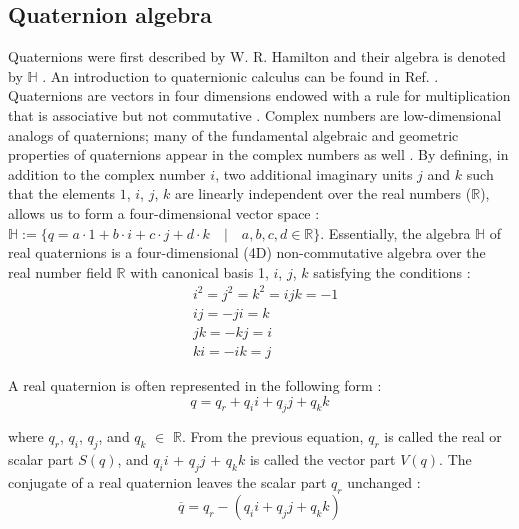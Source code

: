 \documentclass[superscriptaddress,longbibliography,aps,prl,twocolumn,10pt]{revtex4-2}
\begin{document}
\subsection*{\normalsize{Quaternion algebra}}
Quaternions were first described by W. R. Hamilton \cite{Grant2015} and their algebra is denoted by $\mathbb{H}$ \cite{BayroCorrochano2019}. An introduction to quaternionic calculus can be found in Ref. \cite{Morais2014}. Quaternions are vectors in four dimensions endowed with a rule for multiplication that is associative but not commutative \cite{Goldman2011}. Complex numbers are low-dimensional analogs of quaternions; many of the fundamental algebraic and geometric properties of quaternions appear in the complex numbers as well \cite{Goldman2011}. By defining, in addition to the complex number $i$, two additional imaginary units $j$ and $k$ such that the elements $1$, $i$, $j$, $k$ are linearly independent over the real numbers ($\mathbb{R}$), allows us to form a four-dimensional vector space \cite{Kramer2017}: $\mathbb{H}:=\{ q = a \cdot 1 + b\cdot i + c\cdot j + d \cdot k \quad | \quad a, b, c, d \in \mathbb{R}\}$. Essentially, the algebra $\mathbb{H}$ of real quaternions is a four-dimensional (4D) non-commutative algebra over the real number field $\mathbb{R}$ with canonical basis 1, $i$, $j$, $k$ satisfying the conditions \cite{Morais2014}:
    \begin{equation} \label{eq:definitions}
    \begin{aligned}
        &{i^2} = {j^2} = {k^2} = ijk =  - 1\\
        &ij = - ji = k\\
        &jk = - kj = i\\
        &ki = - ik = j
    \end{aligned}
    \end{equation}
    
\noindent
A real quaternion is often represented in the following form \cite{Morais2014}:
    \begin{equation} \label{eq:representation}
        q = {q_r} + {q_i}i + {q_j}j + {q_k}k
    \end{equation}
    
\noindent
where $q_{r}$, $q_{i}$, $q_{j}$, and $q_{k}$ $\in$ $\mathbb{R}$. From the previous equation, $q_{r}$ is called the real or scalar part $S(q)$, and $q_{i}i$ + $q_{j}j$ + $q_{k}k$ is called the vector part $V(q)$. The conjugate of a real quaternion leaves the scalar part $q_{r}$ unchanged \cite{Morais2014}:
    \begin{equation} \label{eq:conjugate}
        \overline q  = {q_r} - \left( {{q_i}i + {q_j}j + {q_k}k} \right)
    \end{equation}
    
\end{document}
